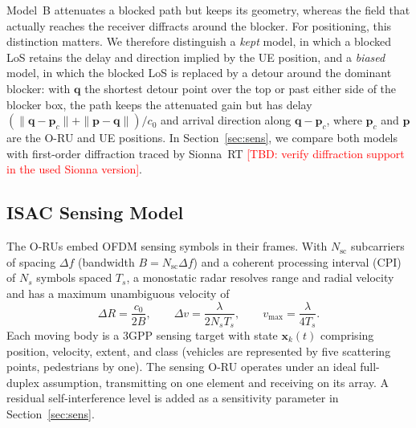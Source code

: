 \documentclass[journal]{IEEEtran}
\newcommand{\tbd}[1]{\textcolor{red}{[TBD: #1]}}
\begin{document}
Model~B attenuates a blocked path but keeps its geometry, whereas the
field that actually reaches the receiver diffracts around the blocker.
For positioning, this distinction matters. We therefore distinguish a
\emph{kept} model, in which a blocked LoS retains the delay and
direction implied by the UE position, and a \emph{biased} model, in
which the blocked LoS is replaced by a detour around the dominant
blocker: with $\mathbf q$ the shortest detour point over the top or past
either side of the blocker box, the path keeps the attenuated gain but
has delay $(\|\mathbf q-\mathbf p_c\|+\|\mathbf p-\mathbf q\|)/c_0$ and
arrival direction along $\mathbf q-\mathbf p_c$, where $\mathbf p_c$ and
$\mathbf p$ are the O-RU and UE positions. \textcolor{propcol}{In
Section~\ref{sec:sens}, we compare both models with first-order diffraction traced
by Sionna~RT \tbd{verify diffraction support in the used Sionna
version}.}

\subsection{ISAC Sensing Model}
The O-RUs embed OFDM sensing symbols in their frames. With
$N_{\mathrm{sc}}$ subcarriers of spacing $\Delta f$ (bandwidth
$B=N_{\mathrm{sc}}\Delta f$) and a coherent processing interval (CPI)
of $N_s$ symbols spaced $T_s$, a monostatic radar resolves range and
radial velocity and has a maximum unambiguous velocity of
\begin{equation}
\Delta R=\frac{c_0}{2B},\qquad
\Delta v=\frac{\lambda}{2N_sT_s},\qquad
v_{\max}=\frac{\lambda}{4T_s}.
\label{eq:res}
\end{equation}
Each moving body is a 3GPP sensing target \cite{3gpp38901} with state
$\mathbf x_k(t)$ comprising position, velocity, extent, and class
(vehicles are represented by five scattering points, pedestrians by
one). The sensing O-RU operates under an ideal full-duplex assumption,
transmitting on one element and receiving on its array.
\textcolor{propcol}{A residual self-interference level is added as a
sensitivity parameter in Section~\ref{sec:sens}.}
\end{document}
